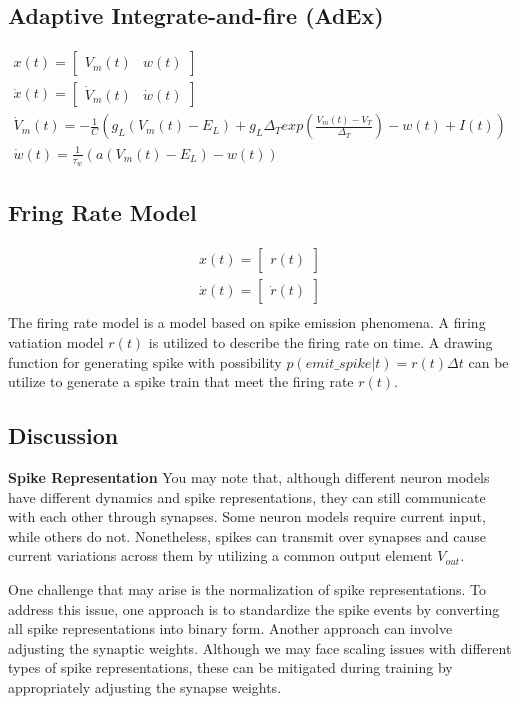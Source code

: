 \subsection{Adaptive Integrate-and-fire (AdEx)}
\begin{align}
    x(t) = \begin{bmatrix}V_m(t) & w(t)\end{bmatrix} \label{eq:smm-lif-1} \\
    \dot x(t) = \begin{bmatrix}\dot V_m(t) & \dot w(t)\end{bmatrix} \label{eq:smm-lif-2} \\
    \dot V_m(t) = -\frac{1}{C}(g_L(V_m(t) - E_L) + g_L\Delta_T exp(\frac{V_m(t) - V_T}{\Delta_T}) - w(t) + I(t)) \\
    \dot w(t) = \frac{1}{\tau_w}(a(V_m(t) - E_L) - w(t))
\end{align}

\subsection{Fring Rate Model}
\begin{align}
    x(t) = \begin{bmatrix}r(t)\end{bmatrix} \label{eq:smm-lif-1} \\
    \dot x(t) = \begin{bmatrix}\dot r(t)\end{bmatrix} \label{eq:smm-lif-2} \\
\end{align}
The firing rate model is a model based on spike emission phenomena. A firing vatiation model $r(t)$
is utilized to describe the firing rate on time.
A drawing function for generating spike with possibility $p(emit\_spike| t) = r(t)\Delta t$ 
can be utilize to generate a spike train that meet the firing rate $r(t)$. 

\subsection{Discussion}

\textbf{Spike Representation}
You may note that, although different neuron models have different dynamics and spike 
representations, they can still communicate with each other through synapses. Some neuron
 models require current input, while others do not. Nonetheless, spikes can transmit 
 over synapses and cause current variations across them by utilizing a common output element $V_{out}$. 
 
 One challenge that may arise is the normalization of spike representations.
To address this issue, one approach is to standardize the spike events by converting all
 spike representations into binary form. Another approach can involve adjusting the synaptic weights.
  Although we may face scaling issues with different types of spike representations, these
   can be mitigated during training by appropriately adjusting the synapse weights.


